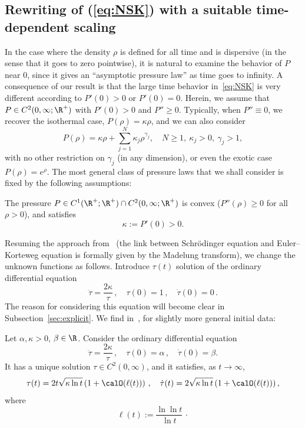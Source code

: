 \subsection{Rewriting of (\ref{eq:NSK}) with a suitable time-dependent scaling}\label{sec:large-time}

In the case where the density $\rho$ is defined for all time and is dispersive (in the sense that it goes to zero pointwise), it is natural to examine the behavior of $P$ near $0$, since it gives an ``asymptotic pressure law'' as time goes to infinity. A consequence of our result is that the large time behavior in~\eqref{eq:NSK} is very different according to $P'(0)>0$ or $P'(0)=0$. Herein, we assume that $P\in C^2(0,\infty;\R^+)$ with $P'(0)>0$ and $P''\ge 0$. Typically, when $P''\equiv 0$, we recover the isothermal case, $P(\rho)=\kappa\rho$, and we can also consider
\begin{equation*}
P(\rho)=\kappa \rho +\sum_{j=1}^N
\kappa_j\rho^{\gamma_j},\quad N\ge 1,\ \kappa_j>0,\ \gamma_j>1,
\end{equation*}
with no other restriction on $\gamma_j$ (in any dimension), or even the exotic case $P(\rho)=e^\rho$. The most general class of pressure laws that we shall consider is fixed by the following assumptions:

\begin{hyp}\label{hyp:P-temps-long}
The pressure $P\in C^1(\R^+;\R^+)\cap C^2(0,\infty;\R^+)$ is convex ($P''(\rho)\ge 0$ for all $\rho> 0$), and satisfies
\[
\kappa:=P'(0)>0.
\]
\end{hyp}

Resuming the approach from~\cite{CaGa18} (the link between Schr\"odinger equation and Euler--Korteweg equation is formally given by the Madelung transform), we change the unknown functions as follows. Introduce $\tau(t)$ solution of the ordinary differential equation
\begin{equation}\label{eq:tau}
\ddot \tau = \frac{2\kappa }{\tau} \,,\quad \tau(0)=1\,,\quad \dot
\tau(0)=0\,.
\end{equation}
The reason for considering this equation will become clear in Subsection~\ref{sec:explicit}. We find in~\cite{CaGa18}, for slightly more general initial data:

\begin{lemm}\label{lem:taubis}
Let $\alpha,\kappa>0$, $\beta\in \R$. Consider the ordinary differential equation
\begin{equation}\label{eq:taugen}
\ddot \tau = \frac{2\kappa }{\tau} \,,\quad \tau(0)=\alpha\,,\quad \dot
\tau(0)=\beta.
\end{equation}
It has a unique solution $\tau\in C^2(0,\infty)$, and it satisfies, as $t\to \infty$,
\begin{equation*}
\tau(t)= 2t \sqrt{\kappa \ln t}\left(1+\calO(\ell(t))\right) \,,\quad \dot
\tau(t)=2\sqrt{\kappa\ln t}\left(1+\calO(\ell(t))\right),
\end{equation*}
where
\begin{equation*}
\ell (t):= \frac{\ln \ln t}{ \ln t} \, \cdotp
\end{equation*}
\end{lemm}

